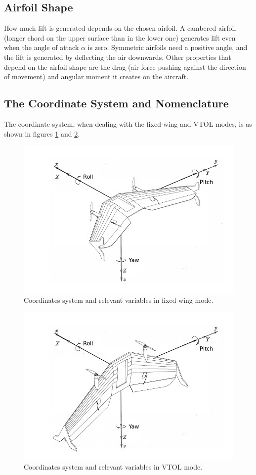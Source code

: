 \subsection{Airfoil Shape}
How much lift is generated depends on the chosen airfoil.
%
A cambered airfoil (longer chord on the upper surface than in the lower one) generates lift even when the angle of attack $\alpha$ is zero.
Symmetric airfoils need a positive angle, and the lift is generated by deflecting the air downwards.
Other properties that depend on the airfoil shape are the drag (air force pushing against the direction of movement) and angular moment it creates on the aircraft. 

\subsection{The Coordinate System and Nomenclature}

The coordinate system, when dealing with the fixed-wing and VTOL modes, is as shown in figures \ref{fig:coords1} and \ref{fig:coords2}.

\begin{figure}[h]
\centering
  \includegraphics[width=0.8\linewidth]{figs/axisfixedwing.png}
  \caption{Coordinates system and relevant variables in fixed wing mode.}
  \label{fig:coords1}
\end{figure}


\begin{figure}[h]
\centering
  \includegraphics[width=0.8\linewidth]{figs/axisvtol.png}
  \caption{Coordinates system and relevant variables in VTOL mode.}
  \label{fig:coords2}
\end{figure}

